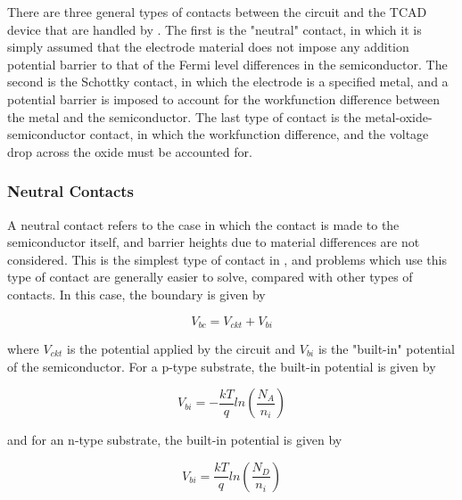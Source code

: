 There are three general types of contacts between the circuit and the TCAD
device that are handled by \Xyce{}.  The first is the "neutral"
contact, in which it is simply assumed that the electrode material does not
impose any addition potential barrier to that of the Fermi level
differences in the semiconductor.  The second is the Schottky contact, in
which the electrode is a specified metal, and a potential barrier is
imposed to account for the workfunction difference between the metal and
the semiconductor.  The last type of contact is the
metal-oxide-semiconductor contact, in which the workfunction difference,
and the voltage drop across the oxide must be accounted for.

\subsubsection{Neutral Contacts}
A neutral contact refers to the case in which the contact is made to the
semiconductor itself, and barrier heights due to material differences are
not considered.  This is the simplest type of contact in \Xyce{}, and
problems which use this type of contact are generally easier to solve,
compared with other types of contacts.    In this case, the boundary is 
given by

\begin{equation}
 V_{bc} = V_{ckt} + V_{bi}
 \label{vbc_equ1}
\end{equation}

where $V_{ckt}$ is the potential applied by the circuit and $V_{bi}$ is the
"built-in" potential of the semiconductor.  For a p-type substrate, the
built-in potential is given by

\begin{equation}
 V_{bi} = - \frac{kT}{q} ln(\frac{N_{A}}{n_{i}})
 \label{vbi_equ1}
\end{equation}

and for an n-type substrate, the built-in potential is given by

\begin{equation}
 V_{bi} = \frac{kT}{q} ln(\frac{N_{D}}{n_{i}})
 \label{vbi_equ2}
\end{equation}

